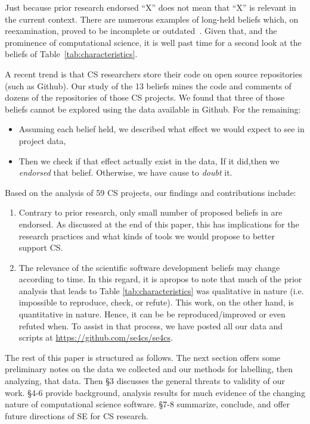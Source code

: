 \documentclass[sigconf,review,anonymous]{acmart}
\newcommand{\bi}{\begin{itemize}}
\newcommand{\ei}{\end{itemize}}
\newcommand{\be}{\begin{enumerate}}
\newcommand{\ee}{\end{enumerate}}
\begin{document}


Just  because  prior research endorsed
 ``X'' does not mean that  ``X'' is relevant in the current context. There are numerous examples of long-held beliefs which, on reexamination, proved to be incomplete or outdated~\cite{menzies17,dev16}. 
Given that, and the prominence  of 
computational science, it is 
well past time for a second look at the beliefs of 
Table~\ref{tab:characteristics}. 

A recent trend is that CS researchers store their code on open source repositories (such as Github).
Our study of the 13 beliefs mines the code and comments of dozens of the repositories of  those CS projects.
We found that three of those beliefs cannot be explored using the data available in Github. For the remaining:
\bi
\item Assuming each belief held,
we described what effect   we would expect to see in project data,
\item Then we check if that effect actually exist in the data,
If it did,then  we  {\em endorsed} that belief. Otherwise, we have cause to {\em doubt} it. 
\ei

Based on the analysis of 59 CS projects, our findings and contributions include: 
\be
\item Contrary to prior research, only small number of proposed beliefs in \cite{johan18_secs} are endorsed. As discussed at the end of this paper, this has implications for the research practices and what kinds of tools we would propose to better support CS. 
\item The relevance of the scientific software development beliefs may change according to time.
In this regard, it is apropos to note that
  much of the prior analysis that leads to Table \ref{tab:characteristics} was qualitative in nature (i.e. impossible to reproduce, check, or refute). This work, on the other hand, is quantitative in nature. Hence, it can be be reproduced/improved or even refuted when.  To assist in that process,  we have posted all our data and scripts at
\url{https://github.com/se4cs/se4cs}. 
\ee
The rest of this paper is structured as follows.
The next section offers some preliminary notes on the data
we collected and our methods for labelling, then analyzing,
that data. Then \S3 discusses the general threats to validity of our work. \S4-6 provide background, analysis results for much evidence
of the changing nature of computational science software. \S7-8 summarize, conclude, and offer future directions of SE for CS research. 
\end{document}
